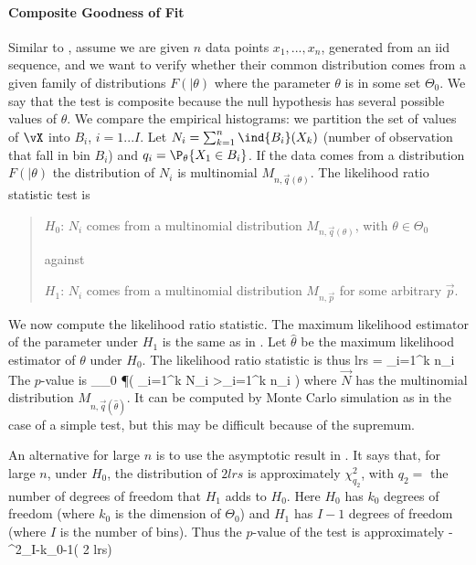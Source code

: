 \paragraph{Composite Goodness of Fit}
Similar to , assume we are given $n$ data
points $x_1, ...,x_n$, generated from an iid sequence, and we
want to verify whether their common distribution comes from a
given family of distributions $F(|\theta)$ where the parameter
$\theta$ is in some set $\Theta_0$. We say that the test is
composite because the null hypothesis has several possible
values of $\theta$. We compare the empirical histograms: we
partition the set of values of ${\vX}$ into  $B_i$,
$i=1...I$. Let $N_i=\sum_{k=1}^n \ind{B_i}(X_k)$ (number of
observation that fall in bin $B_i$) and $q_i=\P_\theta\{X_1\in
B_i\}$. If the data comes from a distribution $F(|\theta)$ the
distribution of $N_i$ is multinomial $M_{n,\vec{q}(\theta)}$.
The likelihood ratio statistic test is
\begin{quote}
$H_0$: $N_i$ comes from a multinomial distribution
$M_{n,\vec{q}(\theta)}$, with $\theta \in \Theta_0$

against

$H_1$: $N_i$ comes from a multinomial distribution $M_{n,\vec{p}}$
for some arbitrary $\vec{p}$. \end{quote}

We now compute the likelihood ratio statistic. The maximum
likelihood estimator of the parameter under $H_1$ is the same
as in . Let $\hat{\theta}$ be the maximum
likelihood estimator of $\theta$ under $H_0$. The likelihood
ratio statistic is thus
 \be {}
 lrs = \sum_{i=1}^k n_i
 \ln{}
 \ee
The $p$-value is
 \be \sup_{\theta \in \Theta_0}
 \P\left(
\sum_{i=1}^k N_i
 \ln{} >\sum_{i=1}^k n_i
 \ln{}
 \right)
 \ee
 where $\vec{N}$ has the multinomial distribution
 $M_{n,\vec{q}(\hat{\theta})}$. It can be computed by Monte Carlo
 simulation as in the case of a simple test, but this may be
 difficult because of the supremum.

 An alternative for large $n$ is to use the asymptotic result in
 . It says that, for large $n$, under $H_0$, the distribution
 of $2 lrs  $  is approximately $\chi^2_{q_2}$, with $q_2=$ the number of degrees of freedom that $H_1$ adds to $H_0$.
 Here $H_0$ has $k_0$ degrees of freedom (where $k_0$ is the dimension of $\Theta_0$) and
 $H_1$ has $I-1$ degrees of freedom (where $I$ is the number of bins).
 Thus the $p$-value of the
 test is approximately
 - \chi^2_{I-k_0-1}( 2 lrs)
 \ee

